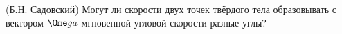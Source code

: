 (Б.Н. Садовский)
Могут ли скорости двух точек твёрдого тела образовывать с вектором $\Ome
ga$ мгновенной угловой скорости разные углы?
